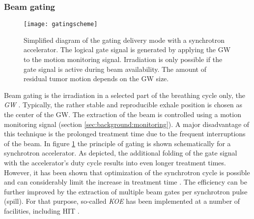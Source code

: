 
\subsubsection{Beam gating}
\label{sec:background:gating}
%
%
\begin{figure}[tbp]
  \centering
  \texttt{[image: gatingscheme]}
  \caption[Diagram of the gating delivery mode with a synchrotron
  accelerator.]{Simplified diagram of the gating delivery mode with a
    synchrotron accelerator. The logical gate signal is generated by
    applying the \acf{GW} to the motion monitoring signal. Irradiation
    is only possible if the gate signal is active during beam
    availability. The amount of residual tumor motion depends on the
    \ac{GW} size.}
  \label{fig:background:gating}
\end{figure}
Beam gating is the irradiation in a selected part of the breathing
cycle only, the \emph{\acf{GW}}
\citep{Minohara2000,Lu2006}. Typically, the rather stable and
reproducible exhale position is chosen as the center of the \acl{GW}.
The extraction of the beam is controlled using a motion monitoring
signal (section \ref{sec:background:monitoring}). A major disadvantage
of this technique is the prolonged treatment time due to the frequent
interruptions of the beam. In figure \ref{fig:background:gating} the
principle of gating is shown schematically for a synchrotron
accelerator. As depicted, the additional folding of the gate signal
with the accelerator's duty cycle results into even longer treatment
times. However, it has been shown that optimization of the synchrotron
cycle is possible and can considerably limit the increase in treatment
time \citep{Tsunashima2008}. The efficiency can be further improved by
the extraction of multiple beam gates per synchrotron pulse
(spill). For that purpose, so-called \emph{\ac{KOE}} has been
implemented at a number of facilities, including \ac{HIT}
\citep{Noda1996,Heeg2004}.

